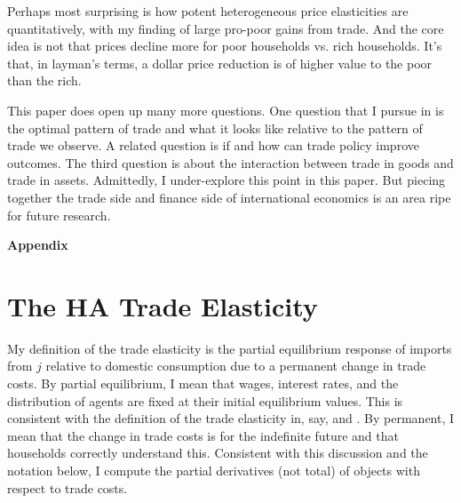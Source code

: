 \documentclass[12pt,pdftex]{article}
\begin{document}
\begin{onehalfspacing}
Perhaps most surprising is how potent heterogeneous price elasticities are quantitatively, with my finding of large pro-poor gains from trade. And the core idea is not that prices decline more for poor households vs. rich households. It's that, in layman's terms, a dollar price reduction is of higher value to the poor than the rich.

This paper does open up many more questions. One question that I pursue in \citet{waughoptimal} is the optimal pattern of trade and what it looks like relative to the pattern of trade we observe. A related question is if and how can trade policy improve outcomes. The third question is about the interaction between trade in goods and trade in assets.  Admittedly, I under-explore this point in this paper. But piecing together the trade side and finance side of international economics is an area ripe for future research.


\appendix

\clearpage
\newpage

\begin{center}
\textbf{\Large Appendix}
\end{center}


\section{The HA Trade Elasticity}

My definition of the trade elasticity is the partial equilibrium response of imports from $j$ relative to domestic consumption due to a permanent change in trade costs. By partial equilibrium, I mean that wages, interest rates, and the distribution of agents are fixed at their initial equilibrium values. This is consistent with the definition of the trade elasticity in, say, \citet{arkolakis2012new} and \citet{simonovska2014elasticity}. By permanent, I mean that the change in trade costs is for the indefinite future and that households correctly understand this. Consistent with this discussion and the notation below, I compute the partial derivatives (not total) of objects with respect to trade costs.


\end{onehalfspacing}
\end{document}

